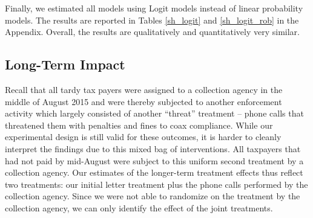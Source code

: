 \documentclass[12pt]{article}
\begin{document}
Finally, we estimated all models using Logit models instead of linear
probability models. The results are reported in Tables \ref{sh_logit}
and \ref{sh_logit_rob} in the Appendix. Overall, the results are
qualitatively and quantitatively very similar.

\subsection{Long-Term Impact}

Recall that all tardy tax payers were assigned to a collection agency
in the middle of August 2015 and were thereby subjected to another
enforcement activity which largely consisted of another ``threat''
treatment -- phone calls that threatened them with penalties and fines
to coax compliance.  While our experimental design is still valid for
these outcomes, it is harder to cleanly interpret the findings due to
this mixed bag of interventions.  All taxpayers that had not paid by
mid-August were subject to this uniform second treatment by a
collection agency.  Our estimates of the longer-term treatment effects
thus reflect two treatments: our initial letter treatment plus the
phone calls performed by the collection agency. Since we were not able
to randomize on the treatment by the collection agency, we can only
identify the effect of the joint treatments.
\end{document}
